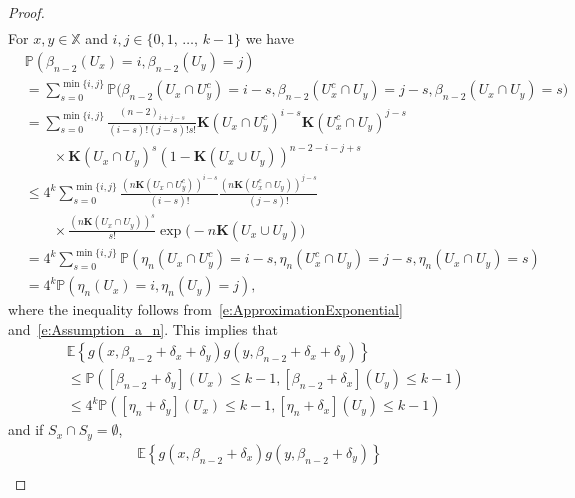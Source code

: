 \documentclass[AHL,Unicode,longabstracts]{cedram}
\newcommand*\bK{\mathbf{K}}
\renewcommand*\P{\mathbb{P}}
\newcommand*\X{\mathbb{X}}
\newcommand{\E}{\mathbb{E}}
\newcommand{\mean}[1] {\E\left\{{#1}\right\}}
\newcommand{\prob}[1]{\P\left(#1\right)}
\begin{document}
\begin{proof}
\begin{equation}
\begin{split}
\end{split}
\end{equation}
For $x,y\in\X$ and $i,j\in\{0,1,\,\hdots,\,k-1\}$ we have
\begin{align*}
& \prob{\beta_{n-2}\left(U_{x}\right)=i, \beta_{n-2}\left(U_{y}\right)=j} \\
& = \sum_{s=0}^{\min\{i,j\}} \P\big(\beta_{n-2}\left(U_{x}\cap U_{y}^c\right)=i-s, \beta_{n-2}\left(U_{x}^c\cap U_{y}\right)=j-s, \beta_{n-2}\left(U_{x}\cap U_{y}\right)=s \big) \\
& = \sum_{s=0}^{\min\{i,j\}} \frac{(n-2)_{i+j-s}}{(i-s)! (j-s)! s!} \bK\left(U_{x}\cap U_{y}^c\right)^{i-s} \bK\left(U_{x}^c\cap U_{y}\right)^{j-s} \\
&\qquad\times\bK\left(U_{x}\cap U_{y}\right)^{s} \left(1- \bK\left(U_{x}\cup U_{y}\right) \right)^{n-2-i-j+s} \\
& \leq 4^k \sum_{s=0}^{\min\{i,j\}} \frac{\left(n\bK\left(U_{x}\cap U_{y}^c\right)\right)^{i-s}}{(i-s)!} \frac{\left(n\bK\left(U_{x}^c\cap U_{y}\right)\right)^{j-s}}{(j-s)!}\\
&\qquad\times\frac{\left(n\bK\left(U_{x}\cap U_{y}\right)\right)^{s}}{s!} \exp\big(-n\bK\left(U_{x}\cup U_{y}\right) \big) \\
& = 4^k \sum_{s=0}^{\min\{i,j\}} \P\left(\eta_{n}\left(U_{x}\cap U_{y}^c\right)=i-s, \eta_{n}\left(U_{x}^c\cap U_{y}\right)=j-s, \eta_{n}\left(U_{x}\cap U_{y}\right)=s \right) \\
& = 4^k \prob{\eta_{n}\left(U_{x}\right)=i, \eta_{n}\left(U_{y}\right)=j},
\end{align*}
where the inequality follows from~\eqref{e:ApproximationExponential} and~\eqref{e:Assumption_a_n}. This implies that
\begin{equation}\label{e:Productgs}
\begin{split}
& \mean{g\left(x,\beta_{n-2}+\delta_x+\delta_y\right) g\left(y,\beta_{n-2}+\delta_x+\delta_y\right)} \\
& \leq \prob{\left[\beta_{n-2}+\delta_y\right]\left(U_{x}\right)\leq k-1, \left[\beta_{n-2}+\delta_x\right]\left(U_{y}\right)\leq k-1} \\
& \leq 4^k \prob{\left[\eta_{n}+\delta_y\right]\left(U_{x}\right)\leq k-1, \left[\eta_{n}+\delta_x\right]\left(U_{y}\right)\leq k-1}
\end{split}
\end{equation}
and if $S_{x}\cap S_{y}=\emptyset$,
\begin{multline}\label{e:gSquareDisjoint}
\mean{g\left(x,\beta_{n-2}+\delta_x\right) g\left(y,\beta_{n-2}+\delta_y\right)}\\

\end{multline}
\end{proof}
\end{document}
